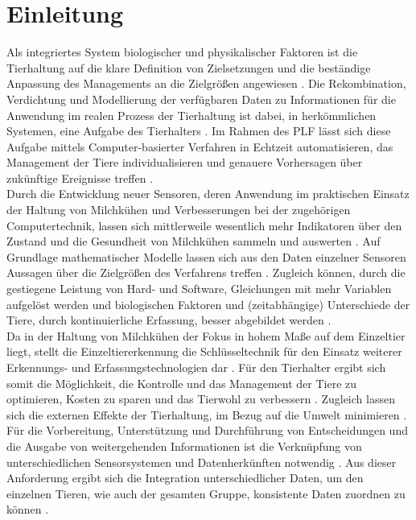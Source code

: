 
\chapter{Einleitung}
Als integriertes System biologischer und physikalischer Faktoren ist die Tierhaltung auf die klare Definition von Zielsetzungen und die beständige Anpassung des Managements an die Zielgrößen angewiesen \autocites[3]{wathes_c._m._is_2008}[2]{klindworth_m._prozesssteuerung_2006}. Die Rekombination, Verdichtung und Modellierung der verfügbaren Daten zu Informationen für die Anwendung im realen Prozess der Tierhaltung ist dabei, in herkömmlichen Systemen, eine Aufgabe des Tierhalters \autocites[2 ff]{wathes_c._m._is_2008}[2]{ klindworth_m._prozesssteuerung_2006}. %
Im Rahmen des PLF lässt sich diese Aufgabe mittels Computer-basierter Verfahren in Echtzeit automatisieren, das Management der Tiere individualisieren und genauere Vorhersagen über zukünftige Ereignisse treffen \autocites[2 ff]{wathes_c._m._is_2008}[33 ff]{gallmann_e._methoden_2016}.\\
Durch die Entwicklung neuer Sensoren, deren Anwendung im praktischen Einsatz der Haltung von Milchkühen und Verbesserungen bei der zugehörigen Computertechnik, lassen sich mittlerweile wesentlich mehr Indikatoren über den Zustand und die Gesundheit von Milchkühen sammeln und auswerten \autocite[5]{schulze_c._hybride_2008}. Auf Grundlage mathematischer Modelle lassen sich aus den Daten einzelner Sensoren Aussagen über die Zielgrößen des Verfahrens treffen \autocite[4]{wathes_c._m._is_2008}. Zugleich können, durch die gestiegene Leistung von Hard- und Software, Gleichungen mit mehr Variablen aufgelöst werden und biologischen Faktoren und (zeitabhängige) Unterschiede der Tiere, durch kontinuierliche Erfassung, besser abgebildet werden \autocite[657 ff]{aerts_j.-m._modelling_2010}.\\
Da in der Haltung von Milchkühen der Fokus in hohem Maße auf dem Einzeltier liegt, stellt die Einzeltiererkennung die Schlüsseltechnik für den Einsatz weiterer Erkennungs- und Erfassungstechnologien dar \autocite[6]{klindworth_m._prozesssteuerung_2006}. 
Für den Tierhalter ergibt sich somit die Möglichkeit, die Kontrolle und das Management der Tiere zu optimieren, Kosten zu sparen und das Tierwohl zu verbessern \autocite[2]{banhazi_t._m._precision_2012}. Zugleich lassen sich die externen Effekte der Tierhaltung, im Bezug auf die Umwelt minimieren \autocite[3]{wathes_c._m._is_2008}.\\
Für die Vorbereitung, Unterstützung und Durchführung von Entscheidungen und die Ausgabe von weitergehenden Informationen ist die Verknüpfung von unterschiedlichen Sensorsystemen und Datenherkünften notwendig \autocite[22]{gallmann_e._methoden_2016}. Aus dieser Anforderung ergibt sich die Integration unterschiedlicher Daten, um den einzelnen Tieren, wie auch der gesamten Gruppe, konsistente Daten zuordnen zu können \autocite[22]{ammon_c._probleme_2006}.

